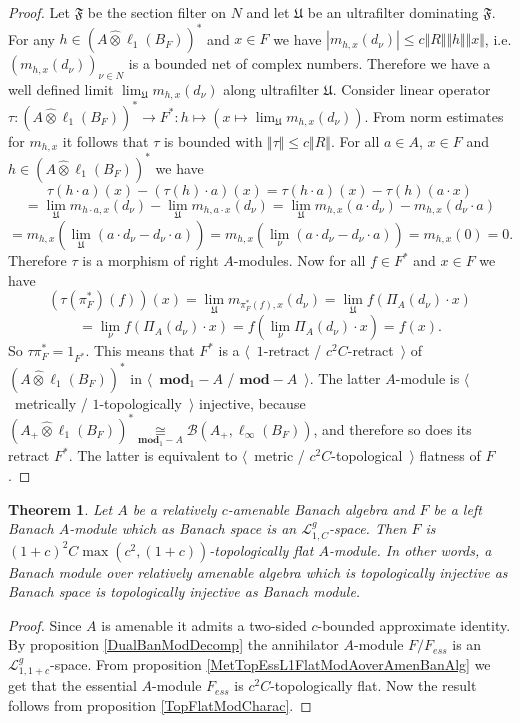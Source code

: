 \documentclass[12pt]{article}
\newtheorem{theorem}{Theorem}[section]
\newcommand{\projtens}{\mathbin{\widehat{\otimes}}}
\newcommand{\isom}[1]{\mathop{\mathbin{\cong}}\limits_{#1}}
\begin{document}
\begin{proof}
Let $\mathfrak{F}$ be the section filter on $N$ and let $\mathfrak{U}$ be an ultrafilter dominating $\mathfrak{F}$. For any $h\in (A\projtens\ell_1(B_F))^*$ and $x\in F$ we have $|m_{h,x}(d_\nu)|\leq c\Vert R\Vert\Vert h\Vert\Vert x\Vert$, i.e. $(m_{h,x}(d_\nu))_{\nu\in N}$ is a bounded net of complex numbers. Therefore we have a well defined limit $\lim_{\mathfrak{U}}m_{h,x}(d_\nu)$ along ultrafilter $\mathfrak{U}$. Consider linear operator $\tau:(A\projtens\ell_1(B_F))^*\to F^*:h\mapsto(x\mapsto\lim_{\mathfrak{U}}m_{h,x}(d_\nu))$. From norm estimates for $m_{h,x}$ it follows that $\tau$ is bounded with $\Vert\tau\Vert\leq c\Vert R\Vert$. For all $a\in A$, $x\in F$ and $h\in (A\projtens\ell_1(B_F))^*$ we have
\[
\tau(h\cdot a)(x)-(\tau(h)\cdot a)(x)
=\tau(h\cdot a)(x)-\tau(h)(a\cdot x)
\]
\[
=\lim_{\mathfrak{U}}m_{h\cdot a,x}(d_\nu)-\lim_{\mathfrak{U}}m_{h,a\cdot x}(d_\nu)
=\lim_{\mathfrak{U}}m_{h,x}(a\cdot d_\nu)-m_{h,x}(d_\nu\cdot a)
\]
\[
=m_{h,x}\left(\lim_{\mathfrak{U}}(a\cdot d_\nu-d_\nu\cdot a)\right)
=m_{h,x}\left(\lim_{\nu}(a\cdot d_\nu-d_\nu\cdot a)\right)
=m_{h,x}(0)
=0.
\]
Therefore $\tau$ is a morphism of right $A$-modules. Now for all $f\in F^*$ and $x\in F$ we have
\[
(\tau(\pi_F^*)(f))(x)
=\lim_{\mathfrak{U}}m_{\pi_F^*(f),x}(d_\nu)
=\lim_{\mathfrak{U}}f(\Pi_A(d_\nu)\cdot x)
\]
\[
=\lim_{\nu}f(\Pi_A(d_\nu)\cdot x)
=f\left(\lim_{\nu}\Pi_A(d_\nu)\cdot x\right)
=f(x).
\]
So $\tau\pi_F^*=1_{F^*}$. This means that $F^*$ is a $\langle$~$1$-retract / $c^2 C$-retract~$\rangle$ of $(A\projtens\ell_1(B_F))^*$
 in $\langle$~$\mathbf{mod}_1-A$ / $\mathbf{mod}-A$~$\rangle$. The latter $A$-module is $\langle$~metrically / $1$-topologically~$\rangle$ injective, because $(A_+\projtens\ell_1(B_F))^*\isom{\mathbf{mod}_1-A}\mathcal{B}(A_+,\ell_\infty(B_F))$, and therefore so does its retract $F^*$. The latter is equivalent to $\langle$~metric / $c^2 C$-topological~$\rangle$ flatness of $F$.
\end{proof}

\begin{theorem}\label{TopL1FlatModAoverAmenBanAlg} Let $A$ be a relatively $c$-amenable Banach algebra and $F$ be a left Banach $A$-module which as Banach space is an $\mathcal{L}_{1, C}^g$-space. Then $F$ is $(1+c)^2C\max(c^2,(1+c))$-topologically flat $A$-module. In other words, a Banach module over relatively amenable algebra which is topologically injective as Banach space is topologically injective as Banach module.
\end{theorem}
\begin{proof} Since $A$ is amenable it admits a two-sided $c$-bounded approximate identity. By proposition \ref{DualBanModDecomp} the annihilator $A$-module $F/F_{ess}$ is an $\mathcal{L}_{1,1+c}^g$-space. From proposition \ref{MetTopEssL1FlatModAoverAmenBanAlg} we get that the essential $A$-module $F_{ess}$ is $c^2 C$-topologically flat. Now the result follows from proposition \ref{TopFlatModCharac}.
\end{proof}
\end{document}
